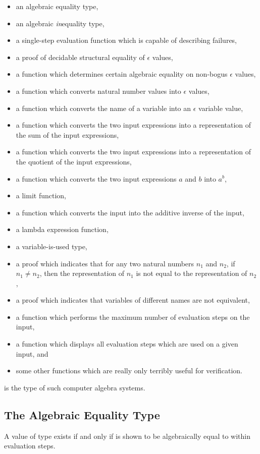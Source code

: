 \documentclass{report}
\begin{document}
\begin{itemize}
  \item an algebraic equality type,
  \item an algebraic \emph{in}equality type,
  \item a single-step evaluation function which is capable of describing failures,
  \item a proof of decidable structural equality of \(\epsilon\) values,
  \item a function which determines certain algebraic equality on non-bogus \(\epsilon\) values,
  \item a function which converts natural number values into \(\epsilon\) values,
  \item a function which converts the name of a variable into an \(\epsilon\) variable value,
  \item a function which converts the two input expressions into a representation of the sum of the input expressions,
  \item a function which converts the two input expressions into a representation of the quotient of the input expressions,
  \item a function which converts the two input expressions \(a\) and \(b\) into \(a^b\),
  \item a limit function,
  \item a function which converts the input into the additive inverse of the input,
  \item a lambda expression function,
  \item a variable-is-used type,
  \item a proof which indicates that for any two natural numbers \(n_1\) and \(n_2\), if \(n_1 \neq n_2\), then the representation of \(n_1\) is not equal to the representation of \(n_2\),
  \item a proof which indicates that variables of different names are not equivalent,
  \item a function which performs the maximum number of evaluation steps on the input,
  \item a function which displays all evaluation steps which are used on a given input, and
  \item some other functions which are really only terribly useful for verification.
\end{itemize}

 is the type of such computer algebra systems.

\subsection{The Algebraic Equality Type}
A value of type      exists if and only if  is shown to be algebraically equal to  within  evaluation steps.
\end{document}
